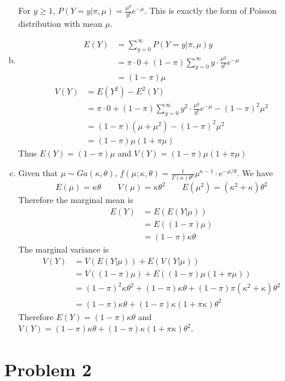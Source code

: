\documentclass[12pt]{article}
\begin{document}
\begin{enumerate}[(a)]
	For $y\geq 1$, $P\left(\left.Y=y \right\vert \pi, \mu\right) = \frac{\mu^{y}}{y!}e^{-\mu}$. This is exactly the form of Poisson distribution with mean $\mu$.
	\item 
	\begin{align*}
		E(Y) &= \sum_{y=0}^{\infty}P\left(\left.Y=y \right\vert \pi, \mu\right) y\\
		&= \pi \cdot 0 + (1-\pi) \sum_{y=0}^{\infty}y\cdot \frac{\mu^{y}}{y!}e^{-\mu}\\
		&= (1-\pi)\mu
	\end{align*}
	\begin{align*}
	    V(Y) &= E(Y^2) - E^2(Y)\\
		&= \pi \cdot 0 + (1-\pi) \sum_{y=0}^{\infty}y^2 \cdot \frac{\mu^{y}}{y!}e^{-\mu} - (1-\pi)^2\mu^2\\
		&=(1-\pi)(\mu+\mu^2) - (1-\pi)^2\mu^2\\
		&= (1-\pi)\mu(1+\pi\mu)
	\end{align*}
	Thus $E(Y) = (1-\pi)\mu$ and $V(Y) = (1-\pi)\mu(1+\pi\mu)$
	\item Given that $\mu \sim Ga(\kappa, \theta)$, $f(\mu;\kappa, \theta)= \frac{1}{\Gamma(\kappa)\theta^{\kappa}}\mu^{\kappa-1}\cdot e^{-\mu/\theta}$. We have
	\[E(\mu)=\kappa\theta\qquad V(\mu)=\kappa\theta^2\qquad E(\mu^2) = (\kappa^2 + \kappa)\theta^2 \]
	Therefore the marginal mean is
	\begin{align*}
		E(Y) &= E\left(E\left(\left.Y\right\vert \mu\right)\right)\\
		&= E\left((1-\pi) \mu\right)\\
		&= (1-\pi)\kappa\theta
	\end{align*}
	The marginal variance is
	\begin{align*}
		V(Y) &= V\left(E\left(\left.Y\right\vert \mu\right)\right) + E\left(V\left(\left.Y\right\vert \mu\right)\right)\\
		&=V\left((1-\pi)\mu\right) + E\left((1-\pi)\mu(1+\pi\mu)\right)\\
		&=(1-\pi)^2 \kappa\theta^2 + (1-\pi)\kappa\theta + (1-\pi)\pi(\kappa^2+\kappa)\theta^2\\
		&= (1-\pi)\kappa\theta + (1-\pi)\kappa(1+\pi\kappa)\theta^2
	\end{align*}
	Therefore $E(Y)=(1-\pi)\kappa\theta$ and $V(Y)=(1-\pi)\kappa\theta + (1-\pi)\kappa(1+\pi\kappa)\theta^2$.
\end{enumerate}

\section*{Problem 2}
\end{document}
